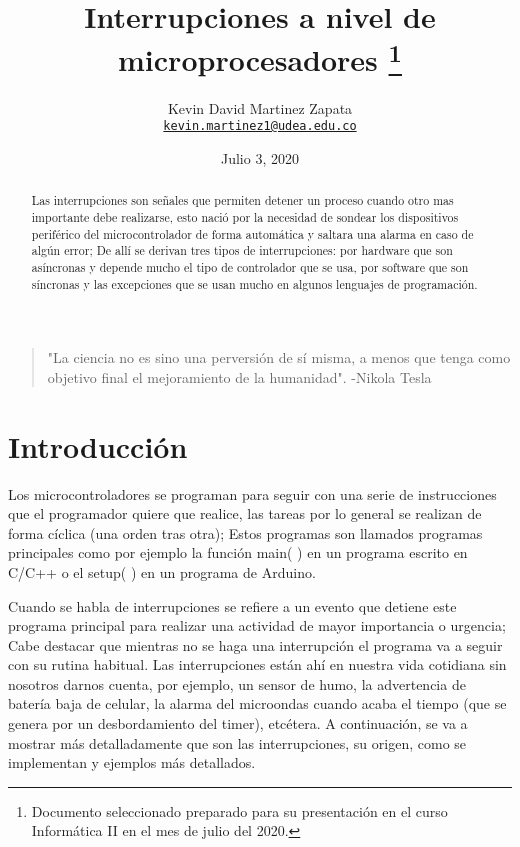 \documentclass[11pt]{article}
\title{Interrupciones a nivel de microprocesadores
\thanks{Documento seleccionado preparado para su presentación en el curso Informática II en el mes de julio del 2020.}
}
\author{Kevin David Martinez Zapata\\%
    \href{mailto:kevin.martinez1@udea.edu.co}{\texttt{kevin.martinez1@udea.edu.co}}
    }
\date{Julio 3, 2020}
\begin{document}
\maketitle

\begin{quote}
"La ciencia no es sino una perversión de sí misma, a menos que tenga como objetivo final el mejoramiento de la humanidad".
-Nikola Tesla
\end{quote}

\begin{abstract}
Las interrupciones son señales que permiten detener un proceso cuando otro mas importante debe realizarse, esto nació por la necesidad de sondear los dispositivos periférico del microcontrolador de forma automática y saltara una alarma en caso de algún error; De allí se derivan tres tipos de interrupciones: por hardware que son asíncronas y depende mucho el tipo de controlador que se usa, por software que son síncronas y las excepciones que se usan mucho en algunos lenguajes de programación.
\end{abstract}

\section{Introducción}
Los microcontroladores se programan para seguir con una serie de instrucciones que el programador quiere que realice, las tareas por lo general se realizan de forma cíclica (una orden tras otra); Estos programas son llamados programas principales como por ejemplo la función main( ) en un programa escrito en C/C++ o el setup( ) en un programa de Arduino.

Cuando se habla de interrupciones se refiere a un evento que detiene este programa principal para realizar una actividad de mayor importancia o urgencia; Cabe destacar que mientras no se haga una interrupción el programa va a seguir con su rutina habitual. Las interrupciones están ahí en nuestra vida cotidiana sin nosotros darnos cuenta, por ejemplo, un sensor de humo, la advertencia de batería baja de celular, la alarma del microondas cuando acaba el tiempo (que se genera por un desbordamiento del timer), etcétera. A continuación, se va a mostrar más detalladamente que son las interrupciones, su origen, como se implementan y ejemplos más detallados.
\cite{interrupciones2}
\end{document}
